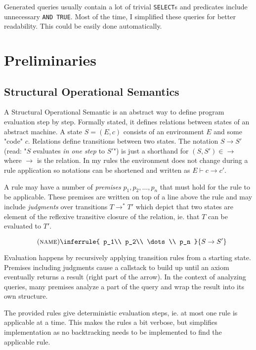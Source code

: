 Generated queries usually contain a lot of trivial \texttt{SELECT}s and predicates include unnecessary \texttt{AND TRUE}. Most of the time, I simplified these queries for better readability. This could be easily done automatically.

\section{Preliminaries}\label{approach}

\subsection{Structural Operational Semantics}

A Structural Operational Semantic is an abstract way to define program evaluation step by step. Formally stated, it defines relations between states of an abstract machine. A state $S = (E, c)$ consists of an environment $E$ and some "code" $c$. Relations define transitions between two states. The notation $S \rightarrow S'$ (read: "$S$ evaluates \textit{in one step} to $S'$") is just a shorthand for $(S, S') \in \rightarrow$ where $\rightarrow$ is the relation. In my rules the environment does not change during a rule application so notations can be shortened and written as $E \vdash c \rightarrow c'$. \cite[Chapter 2]{semanticsWithApplications}

A rule may have a number of \textit{premises} $p_1, p_2, \dots, p_n$ that must hold for the rule to be applicable. These premises are written on top of a line above the rule and may include \textit{judgments} over transitions $T \rightarrow^* T'$ which depict that two states are element of the reflexive transitive closure of the relation, ie. that $T$ can be evaluated to $T'$.

$$\quad(\textsc{name})\inferrule{
   p_1\\
   p_2\\
   \dots\\
   p_n
}{
    S \rightarrow S'
}$$

Evaluation happens by recursively applying transition rules from a starting state. Premises including judgments cause a callstack to build up until an axiom eventually returns a result (right part of the arrow). In the context of analyzing queries, many premises analyze a part of the query and wrap the result into its own structure.

The provided rules give deterministic evaluation steps, ie. at most one rule is applicable at a time. This makes the rules a bit verbose, but simplifies implementation as no backtracking needs to be implemented to find the applicable rule.

